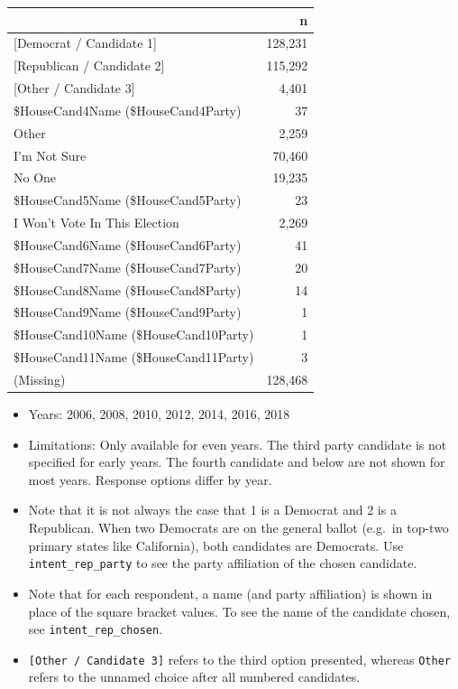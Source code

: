 \documentclass[10pt,article,oneside]{memoir}
\theoremstyle{definition}
\begin{document}
\begin{table}[H]
\centering
\begin{tabular}{lr}
\toprule
 & n\\
\midrule
{[Democrat / Candidate 1]} & 128,231\\
{[Republican / Candidate 2]} & 115,292\\
{[Other / Candidate 3]} & 4,401\\
\$HouseCand4Name (\$HouseCand4Party) & 37\\
Other & 2,259\\
I'm Not Sure & 70,460\\
No One & 19,235\\
\$HouseCand5Name (\$HouseCand5Party) & 23\\
I Won't Vote In This Election & 2,269\\
\$HouseCand6Name (\$HouseCand6Party) & 41\\
\$HouseCand7Name (\$HouseCand7Party) & 20\\
\$HouseCand8Name (\$HouseCand8Party) & 14\\
\$HouseCand9Name (\$HouseCand9Party) & 1\\
\$HouseCand10Name (\$HouseCand10Party) & 1\\
\$HouseCand11Name (\$HouseCand11Party) & 3\\
(Missing) & 128,468\\
\bottomrule
\end{tabular}
\end{table}

\begin{itemize}
\tightlist
\item
  Years: 2006, 2008, 2010, 2012, 2014, 2016, 2018
\item
  Limitations: Only available for even years. The third party candidate
  is not specified for early years. The fourth candidate and below are
  not shown for most years. Response options differ by year.
\item
  Note that it is not always the case that 1 is a Democrat and 2 is a
  Republican. When two Democrats are on the general ballot (e.g.~in
  top-two primary states like California), both candidates are
  Democrats. Use \texttt{intent\_rep\_party} to see the party
  affiliation of the chosen candidate.
\item
  Note that for each respondent, a name (and party affiliation) is shown
  in place of the square bracket values. To see the name of the
  candidate chosen, see \texttt{intent\_rep\_chosen}.
\item
  \texttt{{[}Other\ /\ Candidate\ 3{]}} refers to the third option
  presented, whereas \texttt{Other} refers to the unnamed choice after
  all numbered candidates.
\end{itemize}
\end{document}
